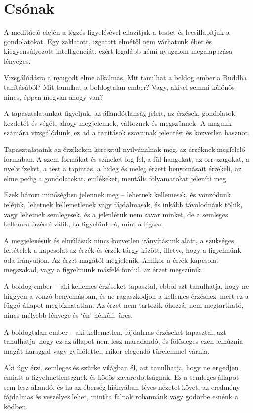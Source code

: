 \chapter{Csónak}

A meditáció elején a légzés figyelésével ellazítjuk a testet és
lecsillapítjuk a gondolatokat. Egy zaklatott, izgatott elmétől nem
várhatunk éber és kiegyensúlyozott intelligenciát, ezért legalább némi
nyugalom megalapozása lényeges.

Vizsgálódásra a nyugodt elme alkalmas. Mit tanulhat a boldog ember a
Buddha tanításából? Mit tanulhat a boldogtalan ember? Vagy, akivel semmi
különös nincs, éppen megvan ahogy van?

A tapasztalatunkat figyeljük, az állandótlanság jeleit, az érzések,
gondolatok kezdetét és végét, ahogy megjelennek, változnak és
megszűnnek. A magunk számára vizsgálódunk, ez ad a tanítások szavainak
jelentést és közvetlen hasznot.

Tapasztalataink az érzékeken keresztül nyilvánulnak meg, az érzéknek
megfelelő formában. A szem formákat és színeket fog fel, a fül hangokat,
az orr szagokat, a nyelv ízeket, a test a tapintás, a hideg és meleg
érzett benyomásait érzékeli, az elme pedig a gondolatokat, emlékeket,
mentális folyamatokat jeleníti meg.

Ezek három minőségben jelennek meg -- lehetnek kellemesek, és vonzódunk
feléjük, lehetnek kellemetlenek vagy fájdalmasak, és inkább távolodnánk
tőlük, vagy lehetnek semlegesek, és a jelenlétük nem zavar minket, de a
semleges kellemes érzéssé válik, ha figyelünk rá, mint a légzés.

A megjelenésük és elmúlásuk nincs közvetlen irányításunk alatt, a
szükséges feltételek a kapcsolat az érzék és érzék-tárgy között,
illetve, hogy a figyelmünk oda irányuljon. Az érzet magától megjelenik.
Amikor a érzék-kapcsolat megszakad, vagy a figyelmünk másfelé fordul, az
érzet megszűnik.

A boldog ember -- aki kellemes érzéseket tapasztal, ebből azt
tanulhatja, hogy ne higgyen a vonzó benyomásban, és ne ragaszkodjon a
kellemes érzéshez, mert ez a függő állapot megbízhatatlan. Az érzet nem
tartozik őhozzá, nem megtartható, nincs mélyebb lényege és `én' nélküli,
üres.

A boldogtalan ember -- aki kellemetlen, fájdalmas érzéseket tapasztal,
azt tanulhatja, hogy ez az állapot nem lesz maradandó, és fölösleges
ezen felhúznia magát haraggal vagy gyűlölettel, mikor elegendő
türelemmel várnia.

Aki úgy érzi, semleges és szürke világban él, azt tanulhatja, hogy ne
engedjen emiatt a figyelmetlenségnek és ködös zavarodottságnak. Ez a
semleges állapot sem lesz állandó, és ha az éberség hiányában téves
nézetet követ, az eredmény fájdalmas és veszélyes lehet, mintha falnak
rohannánk vagy gödörbe esnénk a ködben.

